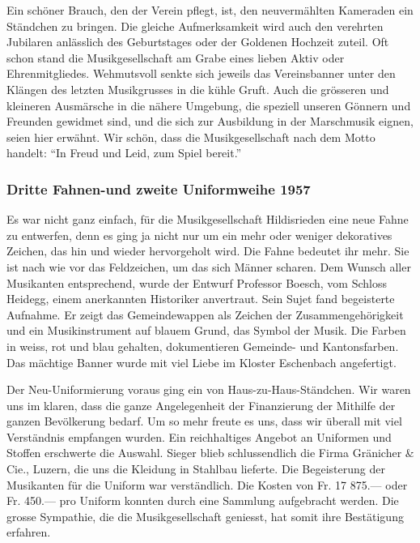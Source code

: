 \begin{history}
    Ein schöner Brauch, den der Verein pflegt, ist, den neuvermählten Kameraden
    ein Ständchen zu bringen. Die gleiche Aufmerksamkeit wird auch den verehrten
    Jubilaren anlässlich des Geburtstages oder der Goldenen Hochzeit zuteil. Oft
    schon stand die Musikgesellschaft am Grabe eines lieben Aktiv oder
    Ehrenmitgliedes. Wehmutsvoll senkte sich jeweils das Vereinsbanner unter den
    Klängen des letzten Musikgrusses in die kühle Gruft. Auch die grösseren und
    kleineren Ausmärsche in die nähere Umgebung, die speziell unseren Gönnern
    und Freunden gewidmet sind, und die sich zur Ausbildung in der Marschmusik
    eignen, seien hier erwähnt. Wir schön, dass die Musikgesellschaft nach dem
    Motto handelt: \enquote{In Freud und Leid, zum Spiel bereit.}

    \subsubsection{Dritte Fahnen-und zweite Uniformweihe 1957}

    Es war nicht ganz einfach, für die Musikgesellschaft Hildisrieden eine neue
    Fahne zu entwerfen, denn es ging ja nicht nur um ein mehr oder weniger
    dekoratives Zeichen, das hin und wieder hervorgeholt wird. Die Fahne
    bedeutet ihr mehr. Sie ist nach wie vor das Feldzeichen, um das sich Männer
    scharen. Dem Wunsch aller Musikanten entsprechend, wurde der Entwurf
    Professor Boesch, vom Schloss Heidegg, einem anerkannten Historiker
    anvertraut. Sein Sujet fand begeisterte Aufnahme. Er zeigt das
    Gemeindewappen als Zeichen der Zusammengehörigkeit und ein Musikinstrument
    auf blauem Grund, das Symbol der Musik. Die Farben in weiss, rot und blau
    gehalten, dokumentieren Gemeinde- und Kantonsfarben. Das mächtige Banner wurde
    mit viel Liebe im Kloster Eschenbach angefertigt.

    Der Neu-Uniformierung voraus ging ein von Haus-zu-Haus-Ständchen. Wir waren
    uns im klaren, dass die ganze Angelegenheit der Finanzierung der Mithilfe
    der ganzen Bevölkerung bedarf. Um so mehr freute es uns, dass wir überall
    mit viel Verständnis empfangen wurden. Ein reichhaltiges Angebot an
    Uniformen und Stoffen erschwerte die Auswahl. Sieger blieb schlussendlich
    die Firma Gränicher \& Cie., Luzern, die uns die Kleidung in Stahlbau
    lieferte. Die Begeisterung der Musikanten für die Uniform war verständlich.
    Die Kosten von Fr. 17 875.— oder Fr. 450.— pro Uniform konnten durch eine
    Sammlung aufgebracht werden. Die grosse Sympathie, die die Musikgesellschaft
    geniesst, hat somit ihre Bestätigung erfahren.

\end{history}

